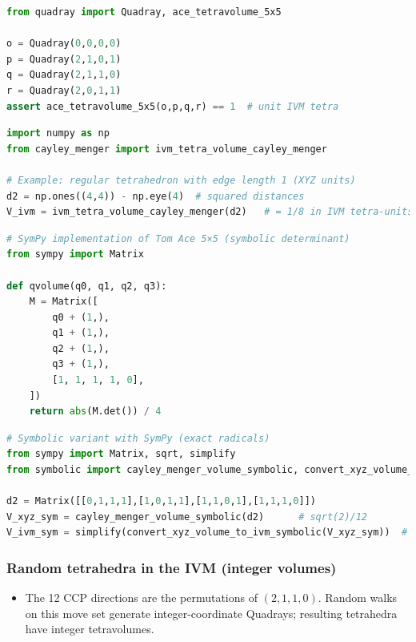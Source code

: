 \documentclass[
  10pt,
]{article}
\providecommand{\tightlist}{%
  \setlength{\itemsep}{0pt}\setlength{\parskip}{0pt}}
\begin{document}
\begin{lstlisting}[language=Python]
from quadray import Quadray, ace_tetravolume_5x5

o = Quadray(0,0,0,0)
p = Quadray(2,1,0,1)
q = Quadray(2,1,1,0)
r = Quadray(2,0,1,1)
assert ace_tetravolume_5x5(o,p,q,r) == 1  # unit IVM tetra
\end{lstlisting}

\begin{lstlisting}[language=Python]
import numpy as np
from cayley_menger import ivm_tetra_volume_cayley_menger

# Example: regular tetrahedron with edge length 1 (XYZ units)
d2 = np.ones((4,4)) - np.eye(4)  # squared distances
V_ivm = ivm_tetra_volume_cayley_menger(d2)   # = 1/8 in IVM tetra-units
\end{lstlisting}

\begin{lstlisting}[language=Python]
# SymPy implementation of Tom Ace 5×5 (symbolic determinant)
from sympy import Matrix

def qvolume(q0, q1, q2, q3):
    M = Matrix([
        q0 + (1,),
        q1 + (1,),
        q2 + (1,),
        q3 + (1,),
        [1, 1, 1, 1, 0],
    ])
    return abs(M.det()) / 4
\end{lstlisting}

\begin{lstlisting}[language=Python]
# Symbolic variant with SymPy (exact radicals)
from sympy import Matrix, sqrt, simplify
from symbolic import cayley_menger_volume_symbolic, convert_xyz_volume_to_ivm_symbolic

d2 = Matrix([[0,1,1,1],[1,0,1,1],[1,1,0,1],[1,1,1,0]])
V_xyz_sym = cayley_menger_volume_symbolic(d2)      # sqrt(2)/12
V_ivm_sym = simplify(convert_xyz_volume_to_ivm_symbolic(V_xyz_sym))  # 1/8
\end{lstlisting}

\hypertarget{random-tetrahedra-in-the-ivm-integer-volumes}{%
\subsubsection{Random tetrahedra in the IVM (integer
volumes)}\label{random-tetrahedra-in-the-ivm-integer-volumes}}

\begin{itemize}
\tightlist
\item
  The 12 CCP directions are the permutations of \((2,1,1,0)\). Random
  walks on this move set generate integer-coordinate Quadrays; resulting
  tetrahedra have integer tetravolumes.
\end{itemize}
\end{document}
